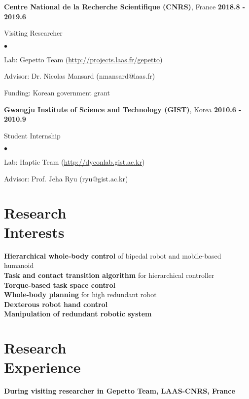 \documentclass[margin,line]{res}
\newenvironment{list1}{
  \begin{list}{\ding{113}}{%
      \setlength{\itemsep}{0in}
      \setlength{\parsep}{0in} \setlength{\parskip}{0in}
      \setlength{\topsep}{0in} \setlength{\partopsep}{0in} 
      \setlength{\leftmargin}{0.17in}}}{\end{list}}
\newenvironment{list2}{
  \begin{list}{$\bullet$}{%
      \setlength{\itemsep}{0in}
      \setlength{\parsep}{0in} \setlength{\parskip}{0in}
      \setlength{\topsep}{0in} \setlength{\partopsep}{0in} 
      \setlength{\leftmargin}{0.2in}}}{\end{list}}
\begin{document}
\begin{resume}
  {\bf Centre National de la Recherche Scientifique (CNRS)}, France  \hfill {\bf 2018.8 - 2019.6} \\
  \vspace*{-.1in}
  \begin{list1}
    \vspace*{-.05in}
    \item[] Visiting Researcher
    \begin{list2}
      \item Lab: Gepetto Team (\url{http://projects.laas.fr/gepetto})
      \item Advisor: Dr. Nicolas Mansard (nmansard@laas.fr)
      \item Funding: Korean government grant
    \end{list2}
  \end{list1}

  {\bf Gwangju Institute of Science and Technology (GIST)}, Korea  \hfill {\bf 2010.6  - 2010.9} \\
  \vspace*{-.1in}
  \begin{list1}
    \vspace*{-.05in}
    \item[] Student Internship
    \begin{list2}
      \item Lab: Haptic Team (\url{http://dyconlab.gist.ac.kr})
      \item Advisor: Prof. Jeha Ryu (ryu@gist.ac.kr)
    \end{list2}
  \end{list1}

  \section{\sc Research\\ Interests}
  \textbf{Hierarchical whole-body control} of bipedal robot and mobile-based humanoid \\
  \textbf{Task and contact transition algorithm} for hierarchical controller \\
  \textbf{Torque-based task space control} \\
  \textbf{Whole-body planning} for high redundant robot \\
  \textbf{Dexterous robot hand control} \\
  \textbf{Manipulation of redundant robotic system}

  \section{\sc Research\\ Experience}
   {\bf During visiting researcher in Gepetto Team, LAAS-CNRS, France}


\end{resume}
\end{document}
